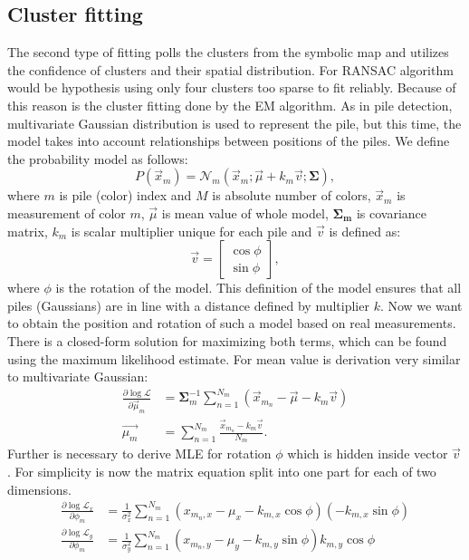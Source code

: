 \subsection{Cluster fitting}
The second type of fitting polls the clusters from the symbolic map and utilizes the confidence of clusters and their spatial distribution. For RANSAC algorithm would be hypothesis using only four clusters too sparse to fit reliably. Because of this reason is the cluster fitting done by the EM algorithm. As in pile detection, multivariate Gaussian distribution is used to represent the pile, but this time, the model takes into account relationships between positions of the piles. We define the probability model as follows:
\begin{equation}
P(\vec{x}_m) = \mathcal{N}_m(\vec{x}_m; \vec{\mu} + k_m\vec{v}; \bm{\Sigma}),
\label{eq:prob}
\end{equation}
where $m$ is pile (color) index and $M$ is absolute number of colors, $\vec{x}_m$ is measurement of color $m$, $\vec{\mu}$ is mean value of whole model, $\bm{\Sigma_m}$ is covariance matrix, $k_m$ is scalar multiplier unique for each pile and $\vec{v}$ is defined as:
\begin{equation}
\vec{v} = \begin{bmatrix}
\cos \phi \\
\sin \phi
\end{bmatrix},
\end{equation}
where $\phi$ is the rotation of the model. This definition of the model ensures that all piles (Gaussians) are in line with a distance defined by multiplier $k$. Now we want to obtain the position and rotation of such a model based on real measurements. There is a closed-form solution for maximizing both terms, which can be found using the maximum likelihood estimate. For mean value is derivation very similar to multivariate Gaussian:
\begin{align}
\frac{\partial \log\mathcal{L} }{\partial \vec{\mu}_m} &=  \bm{\Sigma}^{-1}_m \sum_{n = 1}^{N_m} (\vec{x}_{m_n} - \vec{\mu} - k_m \vec{v}) \\
\vec{\mu_m} &= \sum_{n = 1}^{N_m} \frac{\vec{x}_{m_n} - k_m \vec{v}}{N_m}.
\end{align}
Further is necessary to derive MLE for rotation $\phi$ which is hidden inside vector $\vec{v}$. For simplicity is now the matrix equation split into one part for each of two dimensions.  
\begin{align}
\frac{\partial \log\mathcal{L}_x }{\partial \phi_m} &= \frac{1}{\sigma^2_x} \sum_{n=1}^{N_m} (x_{m_n, x} - \mu_x - k_{m, x} \cos \phi) \left( -k_{m,x} \sin \phi\right)  \\
\frac{\partial \log\mathcal{L}_y }{\partial \phi_m} &= \frac{1}{\sigma^2_y} \sum_{n=1}^{N_m} (x_{m_n, y} - \mu_y - k_{m, y} \sin \phi) k_{m,y} \cos \phi
\end{align}
